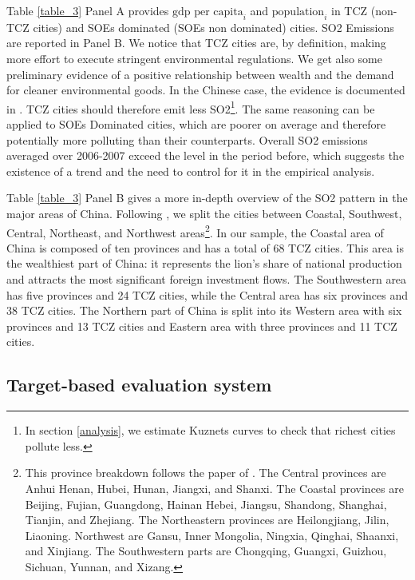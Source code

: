 \documentclass[12pt]{article}
\begin{document}
Table \ref{table_3} Panel A provides $\text{gdp per capita}_i$ and $\text{population}_i$ in TCZ (non-TCZ cities) and SOEs dominated (SOEs non dominated) cities. SO2 Emissions are reported in Panel B. We notice that TCZ cities are, by definition, making more effort to execute stringent environmental regulations. We get also some preliminary evidence of a positive relationship between wealth and the demand for cleaner environmental goods. In the Chinese case, the evidence is documented in \cite{Hering2014-af}. TCZ cities should therefore emit less SO2\footnote{In section \ref{analysis}, we estimate Kuznets curves to check that richest cities pollute less.}. The same reasoning can be applied to SOEs Dominated cities, which are poorer on average and therefore potentially more polluting than their counterparts. Overall SO2 emissions averaged over 2006-2007 exceed the level in the period before, which suggests the existence of a trend and the need to control for it in the empirical analysis. 


Table \ref{table_3} Panel B gives a more in-depth overview of the SO2 pattern in the major areas of China. Following \cite{Wu2017-bl}, we split the cities between Coastal, Southwest, Central, Northeast, and Northwest areas\footnote{This province breakdown follows the paper of \cite{Wu2017-bl}. The Central provinces are Anhui Henan, Hubei, Hunan, Jiangxi, and Shanxi. The Coastal provinces are Beijing, Fujian, Guangdong, Hainan Hebei, Jiangsu, Shandong, Shanghai, Tianjin, and Zhejiang. The Northeastern provinces are Heilongjiang, Jilin, Liaoning. Northwest are Gansu, Inner Mongolia, Ningxia, Qinghai, Shaanxi, and Xinjiang. The Southwestern parts are Chongqing, Guangxi, Guizhou, Sichuan, Yunnan, and Xizang.}. In our sample, the Coastal area of China is composed of ten provinces and has a total of 68 TCZ cities. This area is the wealthiest part of China: it represents the lion's share of national production and attracts the most significant foreign investment flows. The Southwestern area has five provinces and 24 TCZ cities, while the Central area has six provinces and 38 TCZ cities. The Northern part of China is split into its Western area with six provinces and 13 TCZ cities and Eastern area with three provinces and 11 TCZ cities. 



\subsection{Target-based evaluation system}
\end{document}
